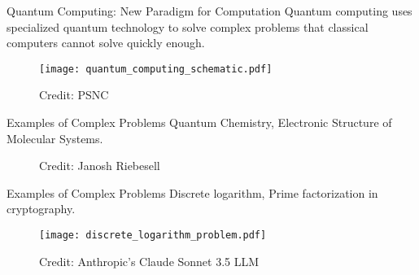 \begin{frame}{Quantum Computing: New Paradigm for Computation}
  Quantum computing uses specialized {\color{red}quantum technology} to solve {\color{red}complex problems}
  that classical computers cannot solve {\color{red}quickly enough}.

 \begin{figure}
    \centering
    \texttt{[image: quantum\_computing\_schematic.pdf]}
    \caption*{Credit: PSNC}
  \end{figure}
\end{frame}


\begin{frame}{Examples of Complex Problems}
    Quantum Chemistry, Electronic Structure of Molecular Systems.
    \begin{figure}
      \def\range{8}
      \def\xyRatio{2/3}
      \def\circSize{1mm}
      \centering
      \caption*{Credit: Janosh Riebesell}
    \end{figure}

\end{frame}

\begin{frame}{Examples of Complex Problems}
    Discrete logarithm, Prime factorization in cryptography.
    \begin{figure}
      \centering
      \texttt{[image: discrete\_logarithm\_problem.pdf]}
      \caption*{Credit: Anthropic's Claude Sonnet 3.5 LLM}
    \end{figure}
\end{frame}

